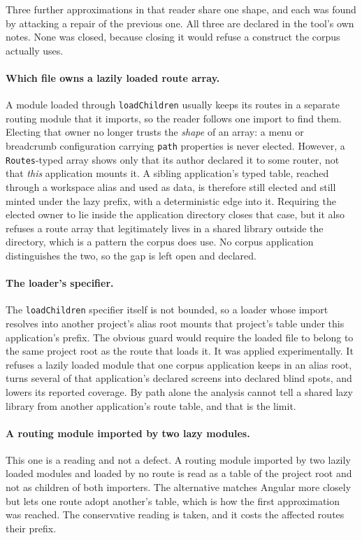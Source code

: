 Three further approximations in that reader share one shape, and each was found by attacking a repair of the previous one. All three are declared in the tool's own notes. None was closed, because closing it would refuse a construct the corpus actually uses.

\paragraph{Which file owns a lazily loaded route array.} A module loaded through \texttt{loadChildren} usually keeps its routes in a separate routing module that it imports, so the reader follows one import to find them. Electing that owner no longer trusts the \emph{shape} of an array: a menu or breadcrumb configuration carrying \texttt{path} properties is never elected. However, a \texttt{Routes}-typed array shows only that its author declared it to some router, not that \emph{this} application mounts it. A sibling application's typed table, reached through a workspace alias and used as data, is therefore still elected and still minted under the lazy prefix, with a deterministic edge into it. Requiring the elected owner to lie inside the application directory closes that case, but it also refuses a route array that legitimately lives in a shared library outside the directory, which is a pattern the corpus does use. No corpus application distinguishes the two, so the gap is left open and declared.

\paragraph{The loader's specifier.} The \texttt{loadChildren} specifier itself is not bounded, so a loader whose import resolves into another project's alias root mounts that project's table under this application's prefix. The obvious guard would require the loaded file to belong to the same project root as the route that loads it. It was applied experimentally. It refuses a lazily loaded module that one corpus application keeps in an alias root, turns several of that application's declared screens into declared blind spots, and lowers its reported coverage. By path alone the analysis cannot tell a shared lazy library from another application's route table, and that is the limit.

\paragraph{A routing module imported by two lazy modules.} This one is a reading and not a defect. A routing module imported by two lazily loaded modules and loaded by no route is read as a table of the project root and not as children of both importers. The alternative matches Angular more closely but lets one route adopt another's table, which is how the first approximation was reached. The conservative reading is taken, and it costs the affected routes their prefix.

